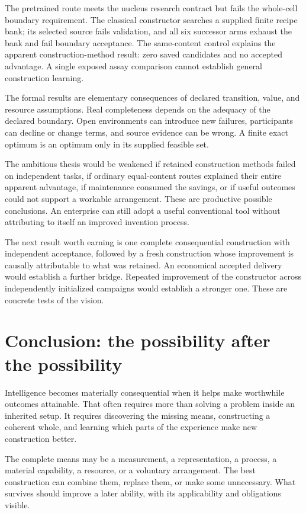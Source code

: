 The pretrained route meets the nucleus research contract but fails the whole-cell boundary requirement. The classical constructor searches a supplied finite recipe bank; its selected source fails validation, and all six successor arms exhaust the bank and fail boundary acceptance. The same-content control explains the apparent construction-method result: zero saved candidates and no accepted advantage. A single exposed assay comparison cannot establish general construction learning.

The formal results are elementary consequences of declared transition, value, and resource assumptions. Real completeness depends on the adequacy of the declared boundary. Open environments can introduce new failures, participants can decline or change terms, and source evidence can be wrong. A finite exact optimum is an optimum only in its supplied feasible set.

The ambitious thesis would be weakened if retained construction methods failed on independent tasks, if ordinary equal-content routes explained their entire apparent advantage, if maintenance consumed the savings, or if useful outcomes could not support a workable arrangement. These are productive possible conclusions. An enterprise can still adopt a useful conventional tool without attributing to itself an improved invention process.

The next result worth earning is one complete consequential construction with independent acceptance, followed by a fresh construction whose improvement is causally attributable to what was retained. An economical accepted delivery would establish a further bridge. Repeated improvement of the constructor across independently initialized campaigns would establish a stronger one. These are concrete tests of the vision.

\section{Conclusion: the possibility after the possibility}

Intelligence becomes materially consequential when it helps make worthwhile outcomes attainable. That often requires more than solving a problem inside an inherited setup. It requires discovering the missing means, constructing a coherent whole, and learning which parts of the experience make new construction better.

The complete means may be a measurement, a representation, a process, a material capability, a resource, or a voluntary arrangement. The best construction can combine them, replace them, or make some unnecessary. What survives should improve a later ability, with its applicability and obligations visible.

